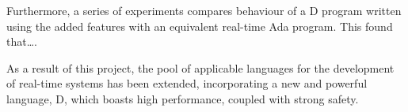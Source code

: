 Furthermore, a series of experiments compares behaviour of a D program written 
using the added features with an equivalent real-time Ada program. This found 
that\ldots. 

As a result of this project, the pool of applicable languages for the development 
of real-time systems has been extended, incorporating a new and powerful language, D, which 
boasts high performance, coupled with strong safety. 





